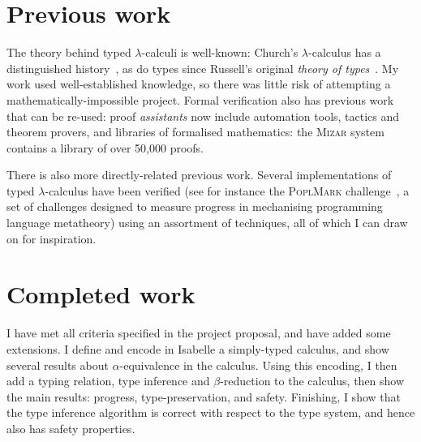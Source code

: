 \section{Previous work}
The theory behind typed \(\lambda\)-calculi is well-known: Church's \(\lambda\)-calculus has a distinguished history~\cite{lambda-history}, as do types since Russell's original \emph{theory of types}~\cite{russell}.
My work used well-established knowledge, so there was little risk of attempting a mathematically-impossible project.
Formal verification also has previous work that can be re-used: proof \emph{assistants} now include automation tools, tactics and theorem provers, and libraries of formalised mathematics: the \textsc{Mizar} system~\cite{mizar} contains a library of over 50,000 proofs.

There is also more directly-related previous work.
Several implementations of typed \(\lambda\)-calculus have been verified (see for instance the \textsc{PoplMark} challenge~\cite{poplmark}, a set of challenges designed to measure progress in mechanising programming language metatheory) using an assortment of techniques, all of which I can draw on for inspiration.

\section{Completed work}
I have met all criteria specified in the project proposal, and have added some extensions.
I define and encode in Isabelle a simply-typed calculus, and show several results about \(\alpha\)-equivalence in the calculus.
Using this encoding, I then add a typing relation, type inference and \(\beta\)-reduction to the calculus, then show the main results: progress, type-preservation, and safety.
Finishing, I show that the type inference algorithm is correct with respect to the type system, and hence also has safety properties.
